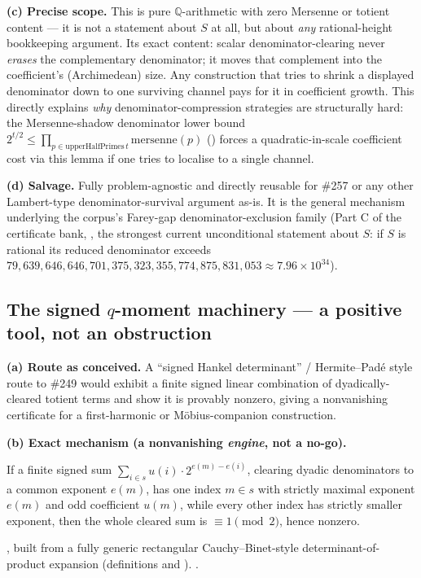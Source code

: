 \textbf{(c) Precise scope.} This is pure \(\mathbb Q\)-arithmetic with zero
Mersenne or totient content — it is not a statement about \(S\) at all, but
about \emph{any} rational-height bookkeeping argument. Its exact content:
scalar denominator-clearing never \emph{erases} the complementary
denominator; it moves that complement into the coefficient's (Archimedean)
size. Any construction that tries to shrink a displayed denominator down to
one surviving channel pays for it in coefficient growth. This directly
explains \emph{why} denominator-compression strategies are structurally hard:
the Mersenne-shadow denominator lower bound
\(2^{t/2}\le\prod_{p\in\mathrm{upperHalfPrimes}\,t}\mathrm{mersenne}(p)\)
() forces a
quadratic-in-scale coefficient cost via this lemma if one tries to localise
to a single channel.

\textbf{(d) Salvage.} Fully problem-agnostic and directly reusable for \#257
or any other Lambert-type denominator-survival argument as-is. It is the
general mechanism underlying the corpus's Farey-gap denominator-exclusion
family (Part C of the certificate bank,
, the strongest
current unconditional statement about \(S\): if \(S\) is rational its
reduced denominator exceeds \(79{,}639{,}646{,}646{,}701{,}375{,}323{,}355{,}774{,}875{,}831{,}053\approx7.96\times10^{34}\)).

\subsection{The signed \(q\)-moment machinery — a positive tool, not an
obstruction}

\textbf{(a) Route as conceived.} A ``signed Hankel determinant'' /
Hermite--Pad\'e style route to \#249 would exhibit a finite signed linear
combination of dyadically-cleared totient terms and show it is provably
nonzero, giving a nonvanishing certificate for a first-harmonic or
Möbius-companion construction.

\textbf{(b) Exact mechanism (a nonvanishing \emph{engine}, not a no-go).}
\begin{lem}
If a finite signed sum \(\sum_{i\in s}u(i)\cdot2^{e(m)-e(i)}\), clearing
dyadic denominators to a common exponent \(e(m)\), has one index \(m\in s\)
with strictly maximal exponent \(e(m)\) and odd coefficient \(u(m)\), while
every other index has strictly smaller exponent, then the whole cleared sum
is \(\equiv1\pmod2\), hence nonzero.
\end{lem}
, built from a fully generic rectangular
Cauchy--Binet-style determinant-of-product expansion
 (definitions
 and
).  
.

